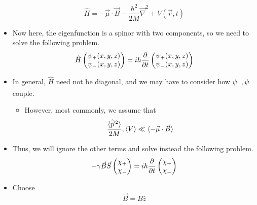 \documentclass[../notes.tex]{subfiles}
\begin{document}
\begin{itemize}
    \begin{equation*}
        \hat{H} = -\vec{\mu}\cdot\vec{B}-\frac{\hbar^2}{2M}\vec{\nabla}^2+V(\vec{r},t)
    \end{equation*}
    \item Now here, the eigenfunction is a spinor with two components, so we need to solve the following problem.
    \begin{equation*}
        \hat{H}
        \begin{pmatrix}
            \psi_+(x,y,z)\\
            \psi_-(x,y,z)\\
        \end{pmatrix}
        = i\hbar\pdv{t}
        \begin{pmatrix}
            \psi_+(x,y,z)\\
            \psi_-(x,y,z)\\
        \end{pmatrix}
    \end{equation*}
    \item In general, $\hat{H}$ need not be diagonal, and we may have to consider how $\psi_+,\psi_-$ couple.
    \begin{itemize}
        \item However, most commonly, we assume that
        \begin{equation*}
            \frac{\langle{\hat{\vec{p}}{\,}^2}\rangle}{2M},\langle{V}\rangle \ll \langle{-\vec{\mu}\cdot\vec{B}}\rangle
        \end{equation*}
    \end{itemize}
    \item Thus, we will ignore the other terms and solve instead the following problem.
    \begin{equation*}
        -\gamma\vec{B}\vec{S}
        \begin{pmatrix}
            \chi_+\\
            \chi_-\\
        \end{pmatrix}
        = i\hbar\pdv{t}
        \begin{pmatrix}
            \chi_+\\
            \chi_-\\
        \end{pmatrix}
    \end{equation*}
    \item Choose
    \begin{equation*}
        \vec{B} = B\hat{z}
    \end{equation*}

\end{itemize}
\end{document}
